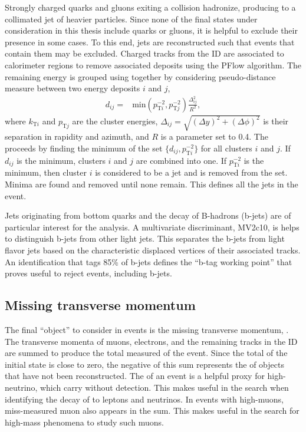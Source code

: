 Strongly charged quarks and gluons exiting a collision hadronize, producing to a collimated jet of heavier particles.
Since none of the final states under consideration in this thesis include quarks or gluons, it is helpful to exclude their presence in some cases.
To this end, jets are reconstructed such that events that contain them may be excluded.
Charged tracks from the ID are associated to calorimeter regions to remove associated deposits using the PFlow algorithm. \cite{jetReco}
The remaining energy is grouped using together by considering pseudo-distance measure between two energy deposits $i$ and $j$,
\begin{equation}\begin{split}
d_{ij} =& \text{min}(p^{-2}_{\text{T}i},p^{-2}_{\text{T}j})\frac{\Delta_{ij}^2}{R^2},
\end{split}\end{equation} 
where $k_{\text{T}i}$ and $p_{\text{T}j}$ are the cluster energies, $\Delta_{ij}=\sqrt{(\Delta y)^2+(\Delta\phi)^2}$ is their separation in rapidity and azimuth, and $R$ is a parameter set to 0.4.
The proceeds by finding the minimum of the set $\{d_{ij},p^{-2}_{\text{T}i}\}$ for all clusters $i$ and $j$. 
If $d_{ij}$ is the minimum, clusters $i$ and $j$ are combined into one.
If $p^{-2}_{\text{T}i}$ is the minimum, then cluster $i$ is considered to be a jet and is removed from the set.
Minima are found and removed until none remain.
This defines all the jets in the event. \cite{antikt}

Jets originating from bottom quarks and the decay of B-hadrons (b-jets) are of particular interest for the \hmm analysis.
A multivariate discriminant, MV2c10, is helps to distinguish b-jets from other light jets. \cite{btag}
This separates the b-jets from light flavor jets based on the characteristic displaced vertices of their associated tracks.
An identification that tags 85\% of b-jets defines the ``b-tag working point'' that proves useful to reject events, including b-jets.

\subsection{Missing transverse momentum}

The final ``object'' to consider in events is the missing transverse momentum, \met.
The transverse momenta of muons, electrons, and the remaining tracks in the ID are summed to produce the total measured \pt of the event.
Since the total \pt of the initial state is close to zero, the negative of this \pt sum represents the \pt of objects that have not been reconstructed.
The \met of an event is a helpful proxy for high-\pt neutrino, which carry \pt without detection.
This makes \met useful in the \hmm search when identifying the decay of \W to leptons and neutrinos.
In events with high-\pi muons, miss-measured muon \pt also appears in the \met sum.
This makes \met useful in the search for high-mass phenomena to study such muons.
